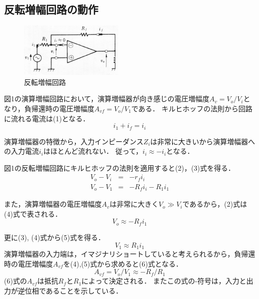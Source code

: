\documentclass[10pt, a4j, dvipdfmx]{jarticle}
\begin{document}
\subsection{反転増幅回路の動作}
\begin{figure}
    \vspace*{-\intextsep}
    \begin{center}
     \includegraphics[width=50mm]{text/fig-1.jpg}
     \caption{反転増幅回路}
    \end{center}
\end{figure}
図1の演算増幅回路において，演算増幅器が向き感じの電圧増幅度$A_v = V_o / V_i$となり，負帰還時の電圧増幅度$A_{vf} = V_o / V_1$である．
キルヒホッフの法則から回路に流れる電流は(1)となる．
\begin{equation}
    i_1 + i_f = i_i
\end{equation}

演算増幅器の特徴から，入力インピーダンス$Z_i$は非常に大きいから演算増幅器への入力電流$i_i$はほとんど流れない．
従って，$i_i \approx -i_i$となる．

図1の反転増幅回路にキルヒホッフの法則を適用すると(2)，(3)式を得る．
\begin{eqnarray}
    V_o - V_i & = & -r_f i_i \\
    V_o - V_1 & = &  -R_f i_i - R_1 i_1
\end{eqnarray}

また，演算増幅器の電圧増幅度$A_v$は非常に大きく$V_o \gg V_i$であるから，(2)式は(4)式で表される．
\begin{equation}
    V_o \approx -R_f i_1
\end{equation}

更に(3), (4)式から(5)式を得る．
\begin{equation}
    V_1 \approx R_1 i_1
\end{equation}
演算増幅器の入力端は，イマジナリショートしていると考えられるから，負帰還時の電圧増幅度$A_{vf}$を(4),(5)式から求めると(6)式となる．
\begin{equation}
    A_{vf} = V_o / V_1 \approx -R_f / R_1
\end{equation}
(6)式の$A_{vf}$は抵抗$R_f$と$R_1$によって決定される．
またこの式の-符号は，入力と出力が逆位相であることを示している．
\end{document}
